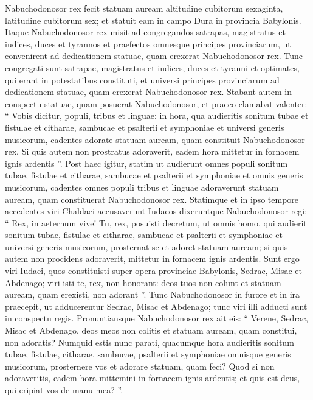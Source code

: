 \begin{biblechapter}
\begin{biblechapter}
\begin{biblechapter}
\verse Nabuchodonosor rex fecit statuam auream altitudine cubitorum sexaginta, latitudine cubitorum sex; et statuit eam in campo Dura in provincia Babylonis. 
 \verse Itaque Nabuchodonosor rex misit ad congregandos satrapas, magistratus et iudices, duces et tyrannos et praefectos omnesque principes provinciarum, ut convenirent ad dedicationem statuae, quam erexerat Nabuchodonosor rex. 
\verse Tunc congregati sunt satrapae, magistratus et iudices, duces et tyranni et optimates, qui erant in potestatibus constituti, et universi principes provinciarum ad dedicationem statuae, quam erexerat Nabuchodonosor rex. Stabant autem in conspectu statuae, quam posuerat Nabuchodonosor, 
\verse et praeco clamabat valenter: “ Vobis dicitur, populi, tribus et linguae: 
\verse in hora, qua audieritis sonitum tubae et fistulae et citharae, sambucae et psalterii et symphoniae et universi generis musicorum, cadentes adorate statuam auream, quam constituit Nabuchodonosor rex. 
\verse Si quis autem non prostratus adoraverit, eadem hora mittetur in fornacem ignis ardentis ”. 
\verse Post haec igitur, statim ut audierunt omnes populi sonitum tubae, fistulae et citharae, sambucae et psalterii et symphoniae et omnis generis musicorum, cadentes omnes populi tribus et linguae adoraverunt statuam auream, quam constituerat Nabuchodonosor rex.
 \verse Statimque et in ipso tempore accedentes viri Chaldaei accusaverunt Iudaeos 
 \verse dixeruntque Nabuchodonosor regi: “ Rex, in aeternum vive! 
\verse Tu, rex, posuisti decretum, ut omnis homo, qui audierit sonitum tubae, fistulae et citharae, sambucae et psalterii et symphoniae et universi generis musicorum, prosternat se et adoret statuam auream; 
\verse si quis autem non procidens adoraverit, mittetur in fornacem ignis ardentis. 
\verse Sunt ergo viri Iudaei, quos constituisti super opera provinciae Babylonis, Sedrac, Misac et Abdenago; viri isti te, rex, non honorant: deos tuos non colunt et statuam auream, quam erexisti, non adorant ”.
 \verse Tunc Nabuchodonosor in furore et in ira praecepit, ut adducerentur Sedrac, Misac et Abdenago; tunc viri illi adducti sunt in conspectu regis. 
\verse Pronuntiansque Nabuchodonosor rex ait eis: “ Verene, Sedrac, Misac et Abdenago, deos meos non colitis et statuam auream, quam constitui, non adoratis? 
\verse Numquid estis nunc parati, quacumque hora audieritis sonitum tubae, fistulae, citharae, sambucae, psalterii et symphoniae omnisque generis musicorum, prosternere vos et adorare statuam, quam feci? Quod si non adoraveritis, eadem hora mittemini in fornacem ignis ardentis; et quis est deus, qui eripiat vos de manu mea? ”.

\end{biblechapter}
\end{biblechapter}
\end{biblechapter}
